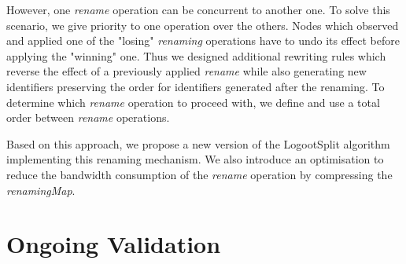 \documentclass[sigplan]{acmart}
\begin{document}
However, one \emph{rename} operation can be concurrent to another one.
To solve this scenario, we give priority to one operation over the others.
Nodes which observed and applied one of the "losing" \emph{renaming} operations have to undo its effect before applying the "winning" one.
Thus we designed additional rewriting rules which reverse the effect of a previously applied \emph{rename} while also generating new identifiers preserving the order for identifiers generated after the renaming.
To determine which \emph{rename} operation to proceed with, we define and use a total order between \emph{rename} operations.


Based on this approach, we propose a new version of the LogootSplit algorithm implementing this renaming mechanism.
We also introduce an optimisation to reduce the bandwidth consumption of the \emph{rename} operation by compressing the \emph{renamingMap}.

\section{Ongoing Validation}

\end{document}
